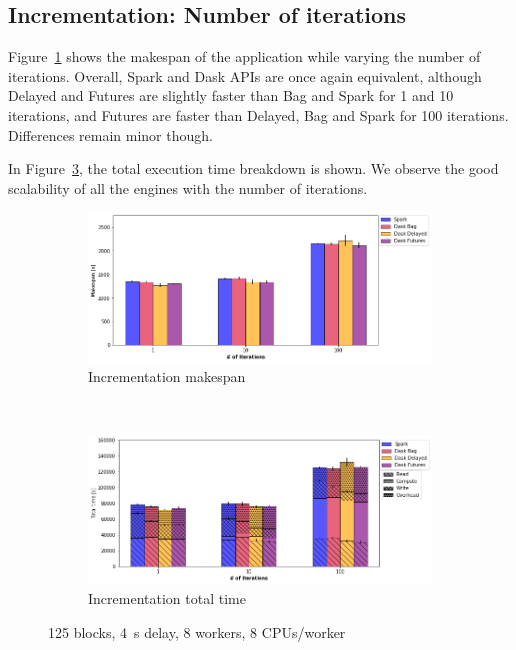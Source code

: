 \documentclass[conference]{IEEEtran}
\begin{document}
\subsection{Incrementation: Number of iterations}
Figure~\ref{fig:inc_ms_itr} shows the makespan of the application while
varying the number of iterations. Overall, Spark and Dask APIs are once
again equivalent, although Delayed and Futures are slightly faster
than Bag and Spark for 1 and 10 iterations, and Futures are faster than
Delayed, Bag and Spark for 100 iterations. Differences remain minor
though.

In Figure~\ref{fig:inc_tt_itr}, the total execution time breakdown is
shown. We observe the good scalability of all the engines with the number of
iterations.


\begin{figure}[!t]
    \centering
    \begin{subfigure}[b]{\columnwidth}
        \includegraphics[clip,width=\columnwidth]{images/inc_itr.png}%
        \caption{Incrementation makespan}\label{fig:inc_ms_itr}
    \end{subfigure}
    \\
    \begin{subfigure}[b]{\columnwidth}
        \includegraphics[clip,width=\columnwidth]{images/inc_idle_itr.png}%
        \caption{Incrementation total time}\label{fig:inc_tt_itr}
    \end{subfigure}
    \caption{125 blocks, \SI{4}{\second} delay, 8 workers, 8 CPUs/worker}
\end{figure}
\end{document}
